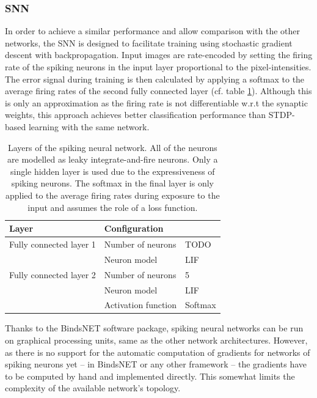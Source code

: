 \subsubsection{SNN}
In order to achieve a similar performance and allow comparison with the other networks, the SNN is designed to facilitate training using stochastic gradient descent with backpropagation. Input images are rate-encoded by setting the firing rate of the spiking neurons in the input layer proportional to the pixel-intensities. The error signal during training is then calculated by applying a softmax to the average firing rates of the second fully connected layer (cf. table \ref{tab:snn-config}). Although this is only an approximation as the firing rate is not differentiable w.r.t the synaptic weights, this approach achieves better classification performance than STDP-based learning with the same network.
\begin{table}[H]
\centering
\begin{tabular}{@{}lll@{}}
\toprule
Layer        & \multicolumn{2}{l}{Configuration} \\ \midrule
Fully connected layer 1 & Number of neurons      & TODO     \\
             & Neuron model           & LIF      \\
Fully connected layer 2 & Number of neurons      & 5        \\
             & Neuron model           & LIF      \\
             & Activation function    & Softmax  \\ \bottomrule
\end{tabular}
\caption[Layers of the spiking neural network]{Layers of the spiking neural network. All of the neurons are modelled as leaky integrate-and-fire neurons. Only a single hidden layer is used due to the expressiveness of spiking neurons. The softmax in the final layer is only applied to the average firing rates during exposure to the input and assumes the role of a loss function.}
\label{tab:snn-config}
\end{table}\noindent
Thanks to the BindsNET software package, spiking neural networks can be run on graphical processing units, same as the other network architectures. However, as there is no support for the automatic computation of gradients for networks of spiking neurons yet -- in BindsNET or any other framework -- the gradients have to be computed by hand and implemented directly. This somewhat limits the complexity of the available network's topology.
